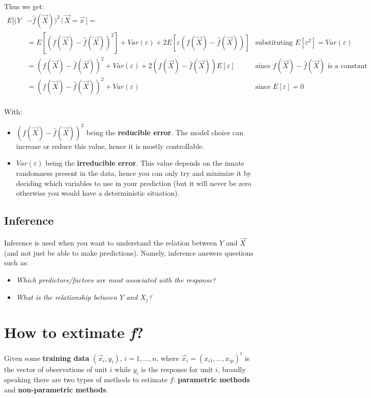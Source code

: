       Thus we get:
      \begin{align*}
        E[(Y&-\hat{f}(\vec{X}))^2 \,|\, \vec{X} = \vec{x}\,] = \\
        & = E[(f(\vec{X}) - \hat{f}(\vec{X}))^2] + Var(\varepsilon) + 2E[\varepsilon(f(\vec{X}) - \hat{f}(\vec{X}))]
        & \text{substituting } E[\varepsilon^2] = Var(\varepsilon) \\
        & = (f(\vec{X}) - \hat{f}(\vec{X}))^2 + Var(\varepsilon) + 2(f(\vec{X}) - \hat{f}(\vec{X}))E[\varepsilon]
        & \text{since } f(\vec{X}) - \hat{f}(\vec{X}) \text{ is a constant}\\
        & = (f(\vec{X}) - \hat{f}(\vec{X}))^2 + Var(\varepsilon)
        & \text{since } E[\varepsilon] = 0 \\
      \end{align*}

      With:
      \begin{itemize}
        \item $(f(\vec{X}) - \hat{f}(\vec{X}))^2$ being the \textbf{reducible
        error}. The model choice can increase or reduce this value, hence it is
        mostly controllable.
        \item $Var(\varepsilon)$ being the \textbf{irreducible error}. This
        value depends on the innate randomness present in the data, hence you
        can only try and minimize it by deciding which variables to use in your
        prediction (but it will never be zero otherwise you would have a
        deterministic situation).
      \end{itemize}


    \subsection{Inference}
      Inference is used when you want to understand the relation between $Y$ and
      $\vec{X}$ (and not just be able to make predictions). Namely, inference
      answers questions such as:
      \begin{itemize}
        \item \textit{Which predictors/factors are most associated with the
        response?}
        \item \textit{What is the relationship between $Y$ and $X_j$?}
      \end{itemize}

  \section{How to extimate \textit{f}?} Given some \textbf{training data}
    $(\vec{x}_i, y_i), \, i = 1, \dots, n$, where $\vec{x}_i = (x_{i1}, \dots,
    x_{ip})^t$ is the vector of observations of unit $i$ while $y_i$ is the
    response for unit $i$, broadly speaking there are two types of methods to
    estimate $f$: \textbf{parametric methods} and \textbf{non-parametric
    methods}.

